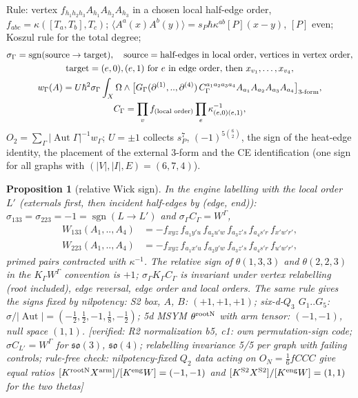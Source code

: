 \documentclass[10pt,a4paper]{article}
\numberwithin{equation}{section}
\newtheorem{proposition}[theorem]{Proposition}
\theoremstyle{definition}
\theoremstyle{remark}
\newcommand{\sgn}{\operatorname{sgn}}
\newcommand{\fso}{\mathfrak{so}}
\newcommand{\Aut}{\operatorname{Aut}}
\newcommand{\ver}[1]{\textup{[verified: #1]}}
\begin{document}
Rule: vertex $f_{h_1h_2h_3}A_{h_1}A_{h_2}A_{h_3}$ in a chosen local half-edge order, $f_{abc}=\kappa([T_a,T_b],T_c)$; $\langle A^a(x)A^b(y)\rangle=s_P\hbar\kappa^{ab}[P](x-y)$, $[P]$ even; Koszul rule for the total degree;
\begin{gather}
\sigma_\Gamma=\sgn(\text{source}\to\text{target}),\quad\text{source}=\text{half-edges in local order, vertices in vertex order},\notag\\
\text{target}=(e,0),(e,1)\ \text{for }e\text{ in edge order, then }x_{v_1},\dots,x_{v_4},\notag\\
w_\Gamma(A)=U\hbar^2\sigma_\Gamma\int_X\Omega\wedge\big[G_\Gamma(\partial^{(1)},..,\partial^{(4)})\,C_\Gamma^{a_1a_2a_3a_4}A_{a_1}A_{a_2}A_{a_3}A_{a_4}\big]_{3\text{-form}},\\
C_\Gamma=\prod_vf_{(\text{local order})}\prod_e\kappa^{-1}_{(e,0)(e,1)},
\end{gather}
$O_2=\sum_\Gamma|\Aut\Gamma|^{-1}w_\Gamma$; $U=\pm1$ collects $s_P^7$, $(-1)^{5\binom62}$, the sign of the heat-edge identity, the placement of the external 3-form and the CE identification (one sign for all graphs with $(|V|,|I|,E)=(6,7,4)$).

\begin{proposition}[relative Wick sign]\label{prop-wick}
In the engine labelling with the local order $L'$ (externals first, then incident half-edges by (edge, end)): $\sigma_{133}=\sigma_{223}=-1=\sgn(L\to L')$ and $\sigma_\Gamma C_\Gamma=W^\Gamma$,
\begin{align}
W_{133}(A_1,..,A_4)&=-f_{xyz}\,f_{a_1y'u}\,f_{a_2u'w}\,f_{a_3z's}\,f_{a_4s'r}\,f_{x'w'r'},\\
W_{223}(A_1,..,A_4)&=-f_{xyz}\,f_{a_1x'u}\,f_{a_2y'w}\,f_{a_3z's}\,f_{a_4s'r}\,f_{u'w'r'},
\end{align}
primed pairs contracted with $\kappa^{-1}$. The relative sign of $\theta(1,3,3)$ and $\theta(2,2,3)$ in the $K_\Gamma W^\Gamma$ convention is $+1$; $\sigma_\Gamma K_\Gamma C_\Gamma$ is invariant under vertex relabelling (root included), edge reversal, edge order and local orders.
The same rule gives the signs fixed by nilpotency: S2 box, $A$, $B$: $(+1,+1,+1)$; six-d-$Q_3$ $G_1..G_5$: $\sigma/|\Aut|=(-\frac12,\frac12,-1,\frac18,-\frac12)$; 5d MSYM $\theta^{\rm rootN}$ with arm tensor: $(-1,-1)$, null space $(1,1)$.
\ver{R2 normalization b5, c1: own permutation-sign code; $\sigma C_{L'}=W^\Gamma$ for $\fso(3)$, $\fso(4)$; relabelling invariance 5/5 per graph with failing controls; rule-free check: nilpotency-fixed $Q_2$ data acting on $O_N=\frac16fCCC$ give equal ratios $[K^{\rm rootN}X^{\rm arm}]/[K^{\rm eng}W]=(-1,-1)$ and $[K^{\rm S2}X^{\rm S2}]/[K^{\rm eng}W]=(1,1)$ for the two thetas}
\end{proposition}
\end{document}
